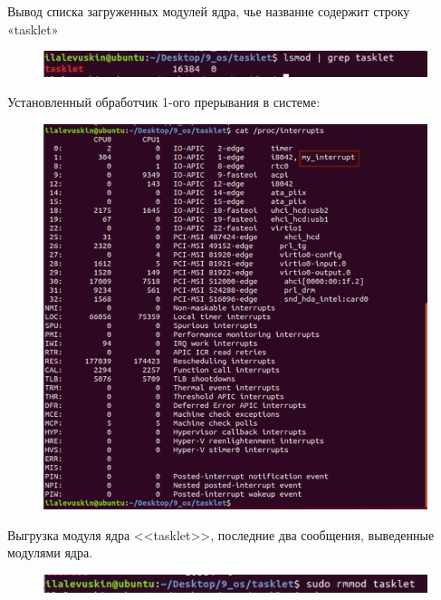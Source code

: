 \documentclass[a4paper,12pt]{article}
\begin{document}
	Вывод списка загруженных модулей ядра, чье название содержит строку «tasklet»
	
	\begin{figure}[h!]
		\begin{center}
			{\includegraphics[scale = 0.7]{2.5.png}}
			\label{2.5}
		\end{center}
	\end{figure}

	\newpage
	
	Установленный обработчик 1-ого прерывания в системе:
	
	\begin{figure}[h!]
		\begin{center}
			{\includegraphics[scale = 0.35]{convert1.png}}
			\label{convert1}
		\end{center}
	\end{figure}
	
	\newpage
	
	Выгрузка модуля ядра <<tasklet>>, последние два сообщения, выведенные модулями ядра.
	
	\begin{figure}[h!]
		\begin{center}
			{\includegraphics[scale = 0.8]{3.png}}
			\label{3}
		\end{center}
	\end{figure}
\end{document}
